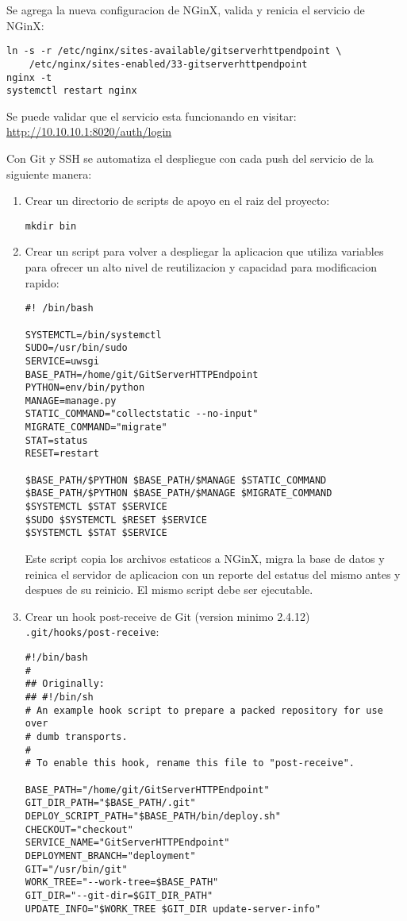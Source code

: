 Se agrega la nueva configuracion de NGinX, valida y renicia el servicio de NGinX:
\begin{lstlisting}
ln -s -r /etc/nginx/sites-available/gitserverhttpendpoint \ 
    /etc/nginx/sites-enabled/33-gitserverhttpendpoint
nginx -t
systemctl restart nginx
\end{lstlisting}

Se puede validar que el servicio esta funcionando en visitar: \url{http://10.10.10.1:8020/auth/login}

Con Git y SSH se automatiza el despliegue con cada push del servicio de la siguiente manera:
\begin{enumerate}
	\item Crear un directorio de scripts de apoyo en el raiz del proyecto:
    \begin{lstlisting}
mkdir bin
    \end{lstlisting}
    \item Crear un script para volver a despliegar la aplicacion que utiliza variables para ofrecer un alto nivel de reutilizacion y capacidad para modificacion rapido:
    \begin{lstlisting}
#! /bin/bash

SYSTEMCTL=/bin/systemctl
SUDO=/usr/bin/sudo
SERVICE=uwsgi
BASE_PATH=/home/git/GitServerHTTPEndpoint
PYTHON=env/bin/python
MANAGE=manage.py
STATIC_COMMAND="collectstatic --no-input"
MIGRATE_COMMAND="migrate"
STAT=status
RESET=restart

$BASE_PATH/$PYTHON $BASE_PATH/$MANAGE $STATIC_COMMAND
$BASE_PATH/$PYTHON $BASE_PATH/$MANAGE $MIGRATE_COMMAND
$SYSTEMCTL $STAT $SERVICE
$SUDO $SYSTEMCTL $RESET $SERVICE
$SYSTEMCTL $STAT $SERVICE
    \end{lstlisting}
    Este script copia los archivos estaticos a NGinX, migra la base de datos y reinica el servidor de aplicacion con un reporte del estatus del mismo antes y despues de su reinicio. El mismo script debe ser ejecutable.
    \item Crear un hook post-receive de Git (version minimo 2.4.12) \\
    \texttt{.git/hooks/post-receive}:
    \begin{lstlisting}[breaklines=true]
#!/bin/bash
#
## Originally:
## #!/bin/sh
# An example hook script to prepare a packed repository for use over
# dumb transports.
#
# To enable this hook, rename this file to "post-receive".

BASE_PATH="/home/git/GitServerHTTPEndpoint"
GIT_DIR_PATH="$BASE_PATH/.git"
DEPLOY_SCRIPT_PATH="$BASE_PATH/bin/deploy.sh"
CHECKOUT="checkout"
SERVICE_NAME="GitServerHTTPEndpoint"
DEPLOYMENT_BRANCH="deployment"
GIT="/usr/bin/git"
WORK_TREE="--work-tree=$BASE_PATH"
GIT_DIR="--git-dir=$GIT_DIR_PATH"
UPDATE_INFO="$WORK_TREE $GIT_DIR update-server-info"


\end{lstlisting}
\end{enumerate}
